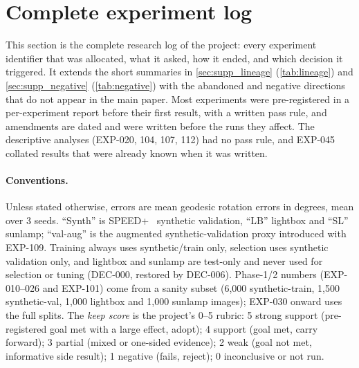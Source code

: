 \section{Complete experiment log}\label{app:log}
\newcommand{\appDnormals}{\texttt{normals16\textasciitilde and}}
\newcommand{\appDdeg}{\ensuremath{^\circ}}

This section is the complete research log of the project: every experiment identifier that was allocated, what it asked, how it ended, and which decision it triggered. It extends the short summaries in \cref{sec:supp_lineage} (\cref{tab:lineage}) and \cref{sec:supp_negative} (\cref{tab:negative}) with the abandoned and negative directions that do not appear in the main paper. Most experiments were pre-registered in a per-experiment report before their first result, with a written pass rule, and amendments are dated and were written before the runs they affect. The descriptive analyses (EXP-020, 104, 107, 112) had no pass rule, and EXP-045 collated results that were already known when it was written.

\paragraph{Conventions.}
Unless stated otherwise, errors are mean geodesic rotation errors in degrees, mean over 3 seeds. ``Synth'' is SPEED+~\cite{park2022speedplus} synthetic validation, ``LB'' lightbox and ``SL'' sunlamp; ``val-aug'' is the augmented synthetic-validation proxy introduced with EXP-109. Training always uses synthetic/train only, selection uses synthetic validation only, and lightbox and sunlamp are test-only and never used for selection or tuning (DEC-000, restored by DEC-006). Phase-1/2 numbers (EXP-010--026 and EXP-101) come from a sanity subset (6,000 synthetic-train, 1,500 synthetic-val, 1,000 lightbox and 1,000 sunlamp images); EXP-030 onward uses the full splits. The \emph{keep score} is the project's 0--5 rubric: 5 strong support (pre-registered goal met with a large effect, adopt); 4 support (goal met, carry forward); 3 partial (mixed or one-sided evidence); 2 weak (goal not met, informative side result); 1 negative (fails, reject); 0 inconclusive or not run.

